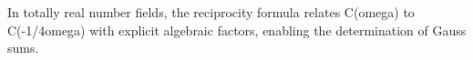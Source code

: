 In totally real number fields, the reciprocity formula relates C(omega) to C(-1/4omega) with explicit algebraic factors, enabling the determination of Gauss sums.
